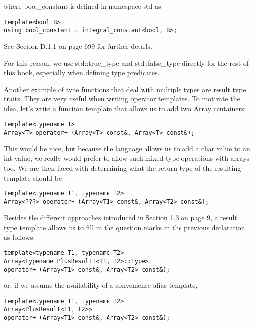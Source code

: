 where bool\_constant is defined in namespace std as

\begin{lstlisting}[style=styleCXX]
template<bool B>
using bool_constant = integral_constant<bool, B>;
\end{lstlisting}

See Section D.1.1 on page 699 for further details.

For this reason, we use std::true\_type and std::false\_type directly for the rest of this book, especially when defining type predicates.


Another example of type functions that deal with multiple types are result type traits. They are very useful when writing operator templates. To motivate the idea, let’s write a function template that allows us to add two Array containers:

\begin{lstlisting}[style=styleCXX]
template<typename T>
Array<T> operator+ (Array<T> const&, Array<T> const&);
\end{lstlisting}

This would be nice, but because the language allows us to add a char value to an int value, we really would prefer to allow such mixed-type operations with arrays too. We are then faced with determining what the return type of the resulting template should be

\begin{lstlisting}[style=styleCXX]
template<typename T1, typename T2>
Array<???> operator+ (Array<T1> const&, Array<T2> const&);
\end{lstlisting}

Besides the different approaches introduced in Section 1.3 on page 9, a result type template allows us to fill in the question marks in the previous declaration as follows:

\begin{lstlisting}[style=styleCXX]
template<typename T1, typename T2>
Array<typename PlusResultT<T1, T2>::Type>
operator+ (Array<T1> const&, Array<T2> const&);
\end{lstlisting}

or, if we assume the availability of a convenience alias template,

\begin{lstlisting}[style=styleCXX]
template<typename T1, typename T2>
Array<PlusResult<T1, T2>>
operator+ (Array<T1> const&, Array<T2> const&);
\end{lstlisting}

